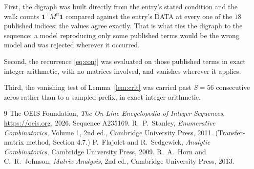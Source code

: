 \documentclass[11pt,a4paper]{article}
\theoremstyle{plain}
\theoremstyle{definition}
\begin{document}
First, the digraph was built directly from the entry's stated condition and the walk counts
$\mathbf{1}^{\!\top}M^{n}\mathbf{1}$ compared against the entry's DATA at every one of
the $18$ published indices; the values agree exactly. That is what ties the digraph to
the sequence: a model reproducing only some published terms would be the wrong model and
was rejected wherever it occurred.

Second, the recurrence \eqref{eq:conj} was evaluated on those published terms in exact
integer arithmetic, with no matrices involved, and vanishes wherever it applies.

Third, the vanishing test of Lemma~\ref{lem:crit} was carried past $S=56$ consecutive
zeros rather than to a sampled prefix, in exact integer arithmetic.

\begin{thebibliography}{9}
 The OEIS Foundation, \emph{The On-Line Encyclopedia of Integer
Sequences}, \url{https://oeis.org}, 2026. Sequence A235169.
 R.~P.~Stanley, \emph{Enumerative Combinatorics}, Volume 1, 2nd ed.,
Cambridge University Press, 2011. (Transfer-matrix method, Section 4.7.)
 P.~Flajolet and R.~Sedgewick, \emph{Analytic Combinatorics}, Cambridge
University Press, 2009.
 R.~A.~Horn and C.~R.~Johnson, \emph{Matrix Analysis}, 2nd ed., Cambridge
University Press, 2013.
\end{thebibliography}
\end{document}
